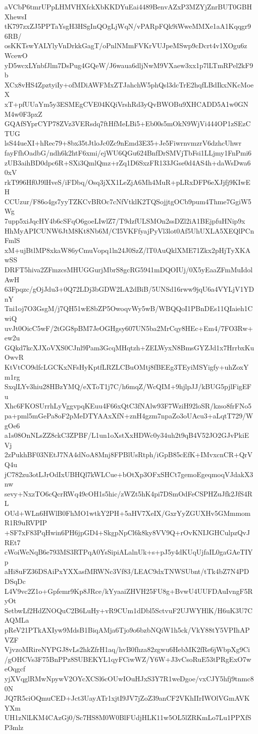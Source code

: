 aVCbP6tmrUPpLHMVHXfckXbKKDYuEai4489BenvAZxP3MZYjZnrBUT0GBHXhewsI
tK797zxZJ5PPTaYsgH3HSgInQOgLjWqN/vPARpFQk9iWweMMXe1aA1Kqqgr96RB/
osKKTswYALYlyVnDrkkGagT/oPnlNMmFVKrVUJpeMSwp9cDcrt4v1XOgu6zWcewO
yD5wcxLYnbfJlm7DsPug4GQeW/J6waua6dljNwM9VXaew3xx1p7lLTmRPel2kF9b
XCx8vHS4ZpztyiIy+ofMDiAWFMxZTJahchW5phQsl3dcTrE2hqfLBdIkxNKcMoeX
xT+pfUUaYm5y3ESMEgCVE04KQiVrshRd3yQvBWOBu9XHCADD5A1w0GNM4w0F3pxZ
GQAfSYprCYP78ZVz3VERsdq7ftHfMeLBi5+Eb00s5mOkN9WjVi444OP1zSEzCTUG
lsS44ueXI+hRec79+8bx35tJtloJc0Zc9nEmd3E35+Je5FiwrnvmzrV6dzhcUhwr
fayFfhOadbG/ndh6k2htF6xmi/ejWU6QGu624BnfDrSMVjTbFsi1LLjmy1FnPmi6
zUB3aihBD0dpc6R+SXi3QmlQmz+rZq1D6SxzFR133JGse0d4AS4h+daWsDwa60xV
rkT996Hf0J9lHveS/iFDbq/Osq3jXX1LeZjA6Mh4MuR+pLRxDFP6eXJjfj9KIwEH
CCUzur/F86o4gs7yyTZKCvBROc7cNfVtklK2TQSojjtgOCb9pum4Thme7GgiW5Wg
7upp5xiJqcHY4b6cSFqO6goeLIwlZ7/T9dzfULSMOn2ssDZl2iA1BEjpfuHNip9x
HhMyAPICUNW6JtM8Kt8Nb6M/CI5VKFfyajPyVl3lot0Af5UhUXLA5XEQlPCnFmlS
xM+ujBtlMP8xkaW86yCmuVopq1ln24J0SzZ/lT0AuQklXME71Zkx2pHjTyXKAwSS
DRFT5hiva2ZFmzcsMHUGGurjMbrS8gcRG5941mDQOIUj/0X5yEaaZFmMuIdolAwH
63Fpqzc/gOjJdu3+0Q72LDj3bGDW2LA2dBiB/5UNSd16rww9jqU6a4VYLjV1YDnY
Tni1oj7O3GsgM/j7QH51wE8bZP5OwoqvWy5wB/WBQQoI1PBnDEs11QIaieh1CwiQ
uvJt0OicC5wF/2tGG8pBM7JeOGHgsy607UN5ba2MrCqy8HEc+Em4/7FO3Rw+ew2u
GQkd7kcXJXoVXS0CJnl9Pam3GcqMHqtzh+ZELWyxN8BmsGYZJd1x7HrrbxKuOwvR
KtVtCO9dfcLGCKxNFsHyKptfLRZLCBuOMtj8fBEEg3TEyiMSYigfy+uhZoxYm1rg
SxqlLYv3hiu28HBzYMQ/eXToT1j7C/h6mqZ/WcQIM+9hjlpJJ/kBUG5pjlFigEFu
Xhc6FKOSUrrhLyVggvpqKEuu4F66xQtC3fNAlw93F7WziH92loSR/kzso8frFNo5
pa+pml5mGePa8oF2pMeDTYAAxXfN+znH4gzm7npaZo3oUAcu3+aLqtT729/WgOe6
a1s08OnNLsZZ8ckC3ZPBF/L1un1oXstXxHDWc0y34uh2t9qB4V52JO2GJvPkiEVj
2zPukhBF03NEtJ7NA4dNoA8Mnj8FPBlUsRtph/iGpB85cEfK+IMvxcnCR+QrVQ4u
jC782zu3otLJrOdIxUBHQl7kWLCue+bOtXp3OFxSHCt7gemoEgeqmoqVJdakX3nw
sevy+NxzTO6cQcrRWq49cOH1s5hic/zWZt5hK4pi7DSmOdFeCSPHZuJfk2JfS4RL
OUd+WLn6HWlB0FhMO1wtkY2PH+5aHV7XeIX/GxrYyZGUXHv5GMmmomR1R9uRVPIP
+SF7xF83PqHwin6PH6jpGD4+SkgpNpCl6k8ky8VV9Q+rOvKNIJGHCulpzQvJREt7
cWoiWeNqB6e793MS3RTPqA0YsSipiALalnUk+s+pJ5y4dKUqUjfaIL0gaGAeTIYp
aHi8uFZ36DSAiPxYXXasfMRWNc3Vf83/LEAC9dxTNWSUbnt/tTk4bZ7N4PDDSqDc
L4V9vc2Z1o+Gpfemr9Kp8JRce/kYyaaiZHVH25FU8g+BvwU4UUFDAuIvngF5RyOt
SetbwLf2HdZNOQuC2B6LuHy+vR9CUm1dDbl5SctvuF2UJWYHlK/H6uK3U7CAQMLa
pReV21PTkAXIyw9MdsB1BiqAMja6Tjo9o6bzbNQiW1h5ck/VkY88tY5VPIhAPVZF
VjvzoMRireNYPGJ8vLs2hkZfrH1aq/hvB0fhza82zgwu6HebMK2fRe6jWbpXg9Ci
/gOHCVs3F75BnPPz8SUBEKYL1qyFCiwWZ/Y6W+J3vCsoRuE53tPRgExO7weOqgcf
yjXVqglRMwNpywV2OYcXCSl6cOUwIOuHJxS3Y7R1weDgoe/vxCJY5hfj9tnmc80N
JQ7R5ciOQmuCED+Jct3UayATr1xjtI9JV7jZoZ39anCF2VKhIIrIWOlVGmAVKYXm
UH1zNlLKM4CAzGj0/Sc7HS8M0W0BlFUdjHLK11w5OL5lZRKmLo7Lu1PPXfSP3mlz

